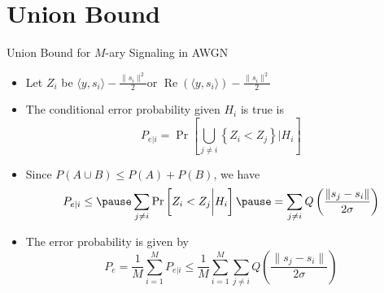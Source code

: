 \documentclass[t]{beamer}
\renewcommand\Re{\operatorname{Re}}
\begin{document}
\section{Union Bound}
\begin{frame}{Union Bound for $M$-ary Signaling in AWGN}
  \footnotesize
  \begin{itemize}
    \item \pause Let $Z_i$ be $\langle y, s_i \rangle - \frac{\lVert s_i \rVert^2}{2}$or $\Re\left(\langle y, s_i \rangle\right) - \frac{\lVert s_i \rVert^2}{2}$
    \item \pause The conditional error probability given $H_i$ is true is
      \begin{equation*}
        P_{e|i} = \Pr\left[\bigcup_{j \neq i} \left\{ Z_i < Z_j \right\} \bigg| H_i \right]
      \end{equation*}
    \item \pause Since $P(A \cup B) \leq P(A) + P(B)$, we have
      \begin{equation*}
        P_{e|i} \leq \pause \sum_{j \neq i} \Pr\left[Z_i < Z_j \bigg| H_i \right] \pause = \sum_{j \neq i} Q\left( \frac{\lVert s_j - s_i \rVert}{2\sigma} \right)
      \end{equation*}
    \item \pause The error probability is given by
      \begin{equation*}
        P_{e} = \frac{1}{M} \sum_{i=1}^M P_{e|i}  \leq \frac{1}{M}\sum_{i=1}^M \sum_{j \neq i} Q\left( \frac{\lVert s_j - s_i \rVert}{2\sigma} \right)
      \end{equation*}
  \end{itemize}
  \normalsize
\end{frame}
\end{document}
